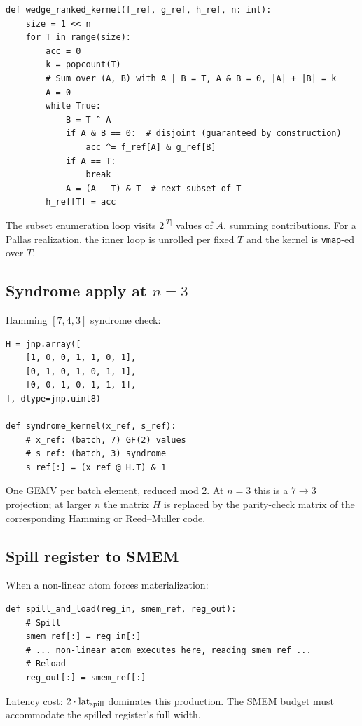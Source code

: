 \begin{lstlisting}
def wedge_ranked_kernel(f_ref, g_ref, h_ref, n: int):
    size = 1 << n
    for T in range(size):
        acc = 0
        k = popcount(T)
        # Sum over (A, B) with A | B = T, A & B = 0, |A| + |B| = k
        A = 0
        while True:
            B = T ^ A
            if A & B == 0:  # disjoint (guaranteed by construction)
                acc ^= f_ref[A] & g_ref[B]
            if A == T:
                break
            A = (A - T) & T  # next subset of T
        h_ref[T] = acc
\end{lstlisting}

The subset enumeration loop visits $2^{|T|}$ values
of $A$, summing contributions. For a Pallas
realization, the inner loop is unrolled per fixed
$T$ and the kernel is \texttt{vmap}-ed over $T$.

\subsection{Syndrome apply at $n = 3$}

Hamming $[7,4,3]$ syndrome check:

\begin{lstlisting}
H = jnp.array([
    [1, 0, 0, 1, 1, 0, 1],
    [0, 1, 0, 1, 0, 1, 1],
    [0, 0, 1, 0, 1, 1, 1],
], dtype=jnp.uint8)

def syndrome_kernel(x_ref, s_ref):
    # x_ref: (batch, 7) GF(2) values
    # s_ref: (batch, 3) syndrome
    s_ref[:] = (x_ref @ H.T) & 1
\end{lstlisting}

One GEMV per batch element, reduced mod 2. At
$n = 3$ this is a $7 \to 3$ projection; at larger
$n$ the matrix $H$ is replaced by the parity-check
matrix of the corresponding Hamming or
Reed--Muller code.

\subsection{Spill register to SMEM}

When a non-linear atom forces materialization:

\begin{lstlisting}
def spill_and_load(reg_in, smem_ref, reg_out):
    # Spill
    smem_ref[:] = reg_in[:]
    # ... non-linear atom executes here, reading smem_ref ...
    # Reload
    reg_out[:] = smem_ref[:]
\end{lstlisting}

Latency cost: $2 \cdot \operatorname{lat}_{\mathrm{spill}}$
dominates this production. The SMEM budget must
accommodate the spilled register's full width.

